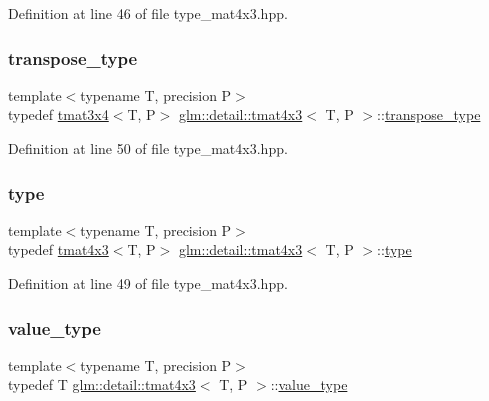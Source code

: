 Definition at line 46 of file type\+\_\+mat4x3.\+hpp.

\mbox{\label{structglm_1_1detail_1_1tmat4x3_a80f4669c67e4c9fb3e9f44d3dcf439d2}} 
\subsubsection{\texorpdfstring{transpose\+\_\+type}{transpose\_type}}
{\footnotesize\ttfamily template$<$typename T, precision P$>$ \\
typedef \hyperlink{structglm_1_1detail_1_1tmat3x4}{tmat3x4}$<$T, P$>$ \hyperlink{structglm_1_1detail_1_1tmat4x3}{glm\+::detail\+::tmat4x3}$<$ T, P $>$\+::\hyperlink{structglm_1_1detail_1_1tmat4x3_a80f4669c67e4c9fb3e9f44d3dcf439d2}{transpose\+\_\+type}}



Definition at line 50 of file type\+\_\+mat4x3.\+hpp.

\mbox{\label{structglm_1_1detail_1_1tmat4x3_aee33430c6a618f2452a740cd4a509a03}} 
\subsubsection{\texorpdfstring{type}{type}}
{\footnotesize\ttfamily template$<$typename T, precision P$>$ \\
typedef \hyperlink{structglm_1_1detail_1_1tmat4x3}{tmat4x3}$<$T, P$>$ \hyperlink{structglm_1_1detail_1_1tmat4x3}{glm\+::detail\+::tmat4x3}$<$ T, P $>$\+::\hyperlink{structglm_1_1detail_1_1tmat4x3_aee33430c6a618f2452a740cd4a509a03}{type}}



Definition at line 49 of file type\+\_\+mat4x3.\+hpp.

\mbox{\label{structglm_1_1detail_1_1tmat4x3_a059eb027e7aebee491c0edcf17235557}} 
\subsubsection{\texorpdfstring{value\+\_\+type}{value\_type}}
{\footnotesize\ttfamily template$<$typename T, precision P$>$ \\
typedef T \hyperlink{structglm_1_1detail_1_1tmat4x3}{glm\+::detail\+::tmat4x3}$<$ T, P $>$\+::\hyperlink{structglm_1_1detail_1_1tmat4x3_a059eb027e7aebee491c0edcf17235557}{value\+\_\+type}}



